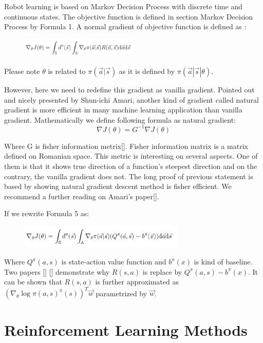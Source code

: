 \documentclass[officiallayout]{tktla}
\begin{document}
Robot learning is based on Markov Decision Process with discrete time and continuous
states. The objective function is defined in section Markov Decision Process
by Formula 1. A normal gradient of objective function is defined as :


\begin{figure}[h!]
  \centering
    \includegraphics[width=0.5\textwidth]{actor_critic}
\end{figure}

Please note $\theta$ is related to $\pi(\vec{a}|\vec{s})$ as it is defined by $\pi(\vec{a}|\vec{s}|\theta)$.

However, here we need to redefine this gradient as vanilla gradient. Pointed out
and nicely presented by Shun-ichi Amari, another kind of gradient called natural
gradient is more efficient in many machine learning application than vanilla gradient.
Mathematically we define following formula as natural gradient:
\begin{equation}
\nabla J(\theta) = G^{-1}\nabla J(\theta)
\end{equation}

Where G is fisher information metrix[].
Fisher information matrix is a matrix defined on Romanian space. This metric
is interesting on several aspects. One of them is that it shows true direction of
a function's steepest direction and on the contrary, the vanilla gradient does not.
The long proof of previous statement is based by showing natural gradient descent
method is fisher efficient. We recommend a further reading on Amari's paper[].

If we rewrite Formula 5 as:

\begin{figure}[h!]
  \centering
    \includegraphics[width=0.7\textwidth]{gradient}
\end{figure}

Where $Q^\pi(a, s)$ is state-action value function and $b^\pi(x)$ is kind of baseline. Two
papers [] [] demonstrate why $R(s, a)$ is replace by $Q^\pi(a, s) - b^\pi(x)$. It can be
shown that $R(s, a)$ is further approximated as $(\nabla_\theta \log\pi(a,s)^\pi(s))^T \vec{w}$ parametrized by $\vec{w}$.
\section{Reinforcement Learning Methods}
\end{document}
